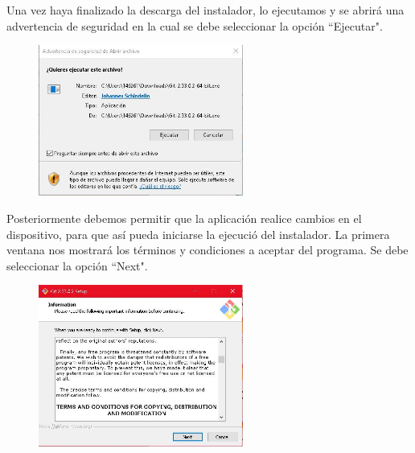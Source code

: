 \documentclass[10pt,a4paper]{article} %
\begin{document}
\begin{enumerate}
{			\pagebreak
			\item Una vez haya finalizado la descarga del instalador, lo ejecutamos y se abrir{\' a} una advertencia de seguridad en la cual se debe seleccionar la opción ``Ejecutar".
			\begin{figure}[H]
				\includegraphics[width=0.6\textwidth]{3.jpg}
				\centering
				\label{img:paso3}
			\end{figure}
			\item Posteriormente debemos permitir que la aplicaci{\' o}n realice cambios en el dispositivo, para que as{\' i} pueda iniciarse la ejecuci{\' o} del instalador. La primera ventana nos mostrar{\' a} los t{\' e}rminos y condiciones a aceptar del programa. Se debe seleccionar la opción ``Next".
			\begin{figure}[H]
				\includegraphics[width=0.6\textwidth]{4.jpg}
				\centering
				\label{img:paso4}
			\end{figure}
			
}
\end{enumerate}
\end{document}
